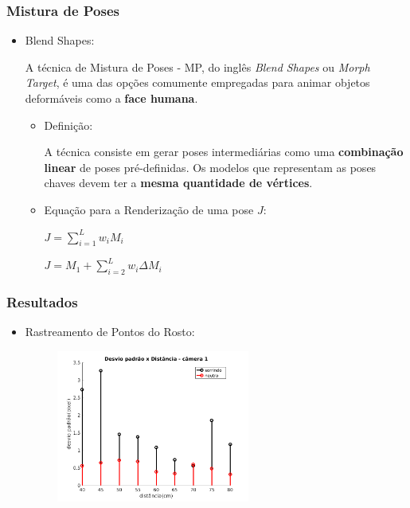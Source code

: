 \documentclass[brazil]{beamer}
\begin{document}
\begin{frame}
\frametitle{Mistura de Poses}
  \begin{itemize}
  	
  	\item Blend Shapes:
  	
  	A técnica de Mistura de Poses - MP, do inglês \textit{Blend Shapes} ou \textit{Morph Target}, é uma das opções comumente empregadas para animar objetos deformáveis como a \textbf{face humana}.
  	
 	 	\begin{itemize}
  	
 	 	\item Definição:
  	
 	 	A técnica consiste em gerar poses intermediárias como uma \textbf{combinação linear} de poses pré-definidas. Os modelos que representam as poses chaves devem ter a \textbf{mesma quantidade de vértices}.
  	
  	
  	    \item Equação para a Renderização de uma pose $J$:
      
   		   $J = \sum_{i=1}^L  w_i M_i$
      
   		   $J = M_1 + \sum_{i = 2}^L w_i \Delta M_i $

  \end{itemize} 

  \end{itemize} 
\end{frame}

\begin{frame}
\frametitle{Resultados}
  \begin{itemize}
      \item Rastreamento de Pontos do Rosto:
      
       \begin{figure}
        \centering
        \includegraphics[width = 0.6\textwidth, keepaspectratio]{./img/desvio_cameraEsquerda.jpg}
      \end{figure}
          
  \end{itemize} 
\end{frame}
\end{document}
